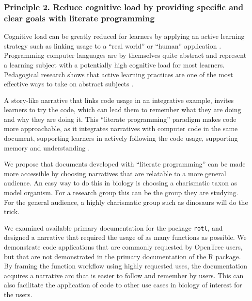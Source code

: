 \documentclass[12pt]{article}
\begin{document}
\subsubsection*{Principle 2. Reduce cognitive load by providing specific and clear goals
with literate programming}

Cognitive load can be greatly reduced for learners by applying an active learning
strategy such as linking usage to a ``real world'' or ``human'' application
\citep{felder2009active}.
Programming computer languages are by themselves quite abstract and represent a
learning subject with a potentially high cognitive load for most learners.
Pedagogical research shows that active learning practices are one of the most effective
ways to take on abstract subjects \citep{freeman2014active}.

A story-like narrative that links code usage in an integrative example, invites learners
to try the code, which can lead them to remember what they are doing and
why they are doing it.
This ``literate programming'' paradigm \citep{knuth1984literate, fritzson2002mathmodelica}
makes code more approachable, as it integrates narratives with computer code in
the same document, supporting learners in actively following
the code usage, supporting memory and understanding \citep{piccolo2016tools}.

We propose that documents developed with ``literate programming'' can be made more
accessible by choosing narratives that are relatable to a more general audience.
An easy way to do this in biology is choosing a charismatic taxon as model organism.
For a research group this can be the group they are studying. For the general audience,
a highly charismatic group such as dinosaurs will do the trick.

We examined available primary documentation for the package \texttt{rotl},
and designed a narrative that required the usage of as many functions as possible.
We demonstrate code applications that are commonly requested by OpenTree users,
but that are not demonstrated in the primary documentation of the R package.
By framing the function workflow using highly requested uses, the documentation acquires a
narrative arc that is easier to follow and remember by users. This can also facilitate
the application of code to other use cases in biology of interest for the users.

\end{document}
